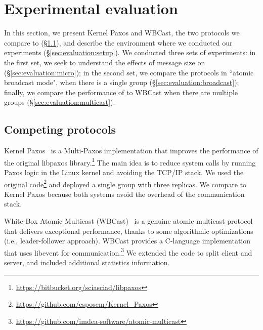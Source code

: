 \section{Experimental evaluation}
\label{sec:experimental-evaluation}

In this section, we present Kernel Paxos and WBCast, the two protocols we compare \libname to (\S\ref{sec:comp}), and
describe the environment where we conducted our experiments (\S\ref{sec:evaluation:setup}).
We conducted three sets of experiments:
in the first set, we seek to understand the effects of message size on \libname (\S\ref{sec:evaluation:micro});
in the second set, we compare the protocols in ``atomic broadcast mode", when there is a single group (\S\ref{sec:evaluation:broadcast});
finally, we compare the performance of \libname to WBCast when there are multiple groups (\S\ref{sec:evaluation:multicast}).

\subsection{Competing protocols}
\label{sec:comp}

Kernel Paxos~\cite{esposito2018kernel} is a Multi-Paxos implementation that improves the performance of the original libpaxos library.\footnote{\url{https://bitbucket.org/sciasciad/libpaxos}}
The main idea is to reduce system calls by running Paxos logic in the Linux kernel and avoiding the TCP/IP stack. 
We used the original code\footnote{\url{https://github.com/esposem/Kernel_Paxos}} and deployed a single group with three replicas.
We compare \libname to Kernel Paxos because both systems avoid the overhead of the communication stack.

White-Box Atomic Multicast (WBCast)~\cite{gotsman2019white} is a genuine atomic multicast protocol that delivers exceptional performance, thanks to some algorithmic optimizations (i.e., leader-follower approach).
 WBCast provides a C-language implementation that uses libevent for communication.\footnote{\url{https://github.com/imdea-software/atomic-multicast}}
 We extended the code to split client and server, and included additional statistics information.


